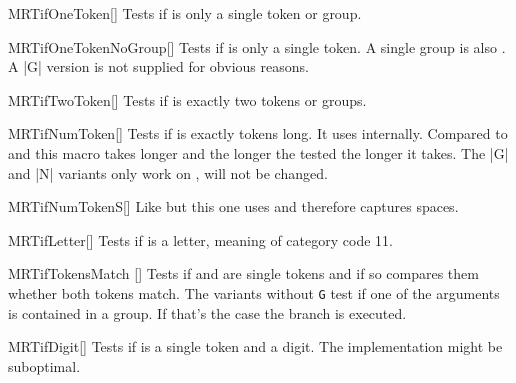 \begin{describemacroTF}[G,N,GN]{MRTifOneToken}[]
  Tests if  is only a single token or group.
\end{describemacroTF}

\begin{describemacroTF}[N]{MRTifOneTokenNoGroup}[]
  Tests if  is only a single token. A single group is also
  . A |G| version is not supplied for obvious reasons.
\end{describemacroTF}

\begin{describemacroTF}[G,N,GN]{MRTifTwoToken}[]
  Tests if  is exactly two tokens or groups.
\end{describemacroTF}

\begin{describemacroTF}[G,N,GN]{MRTifNumToken}[]
  Tests if  is exactly  tokens long. It uses
   internally. Compared to  and
   this macro takes longer and the longer the tested
   the longer it takes. The |G| and |N| variants only work on
  ,  will not be changed.
\end{describemacroTF}

\begin{describemacroTF}[G,N,GN]{MRTifNumTokenS}[]
  Like  but this one uses  and therefore
  captures spaces.
\end{describemacroTF}

\begin{describemacroTF}[G,N,GN]{MRTifLetter}[]
  Tests if  is a letter, meaning of category code 11.
\end{describemacroTF}

\begin{describemacroTF}{MRTifTokensMatch}%
  []
  Tests if  and  are single tokens and if so compares
  them whether both tokens match. The variants without \texttt{G} test if one of
  the arguments is contained in a group. If that's the case the 
  branch is executed.
\end{describemacroTF}

\begin{describemacroTF}[G,N,GN]{MRTifDigit}[]
  Tests if  is a single token and a digit. The implementation might be
  suboptimal.
\end{describemacroTF}


